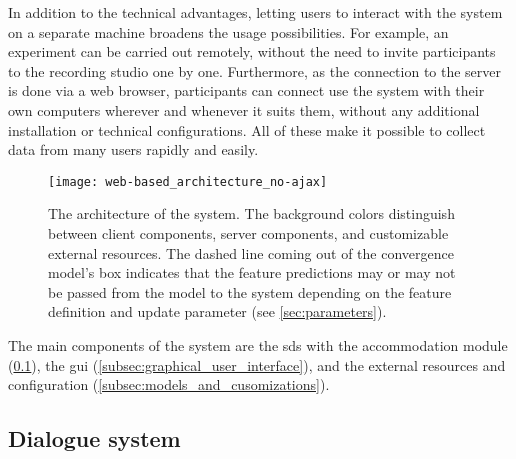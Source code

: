 In addition to the technical advantages, letting users to interact with the system on a separate machine broadens the usage possibilities.
For example, an experiment can be carried out remotely, without the need to invite participants to the recording studio one by one.
Furthermore, as the connection to the server is done via a web browser, participants can connect use the system with their own computers wherever and whenever it suits them, without any additional installation or technical configurations.
All of these make it possible to collect data from many users rapidly and easily.
%
\begin{figure}[t]
	\centering
	\texttt{[image: web-based\_architecture\_no-ajax]}
	\caption[Architecture of the web-based system]
		{The architecture of the system.
		The background colors distinguish between client components, server components, and customizable external resources.
		The dashed line coming out of the convergence model's box indicates that the feature predictions may or may not be passed from the model to the system depending on the feature definition and update parameter (see \cref{sec:parameters}).}
	\label{fig:web-based_architecture}
\end{figure}
%
The main components of the system are the \ac{sds} with the accommodation module (\cref{subsec:dialogue_system}), the \ac{gui} (\cref{subsec:graphical_user_interface}), and the external resources and configuration (\cref{subsec:models_and_cusomizations}).

\subsection{Dialogue system}
\label{subsec:dialogue_system}

